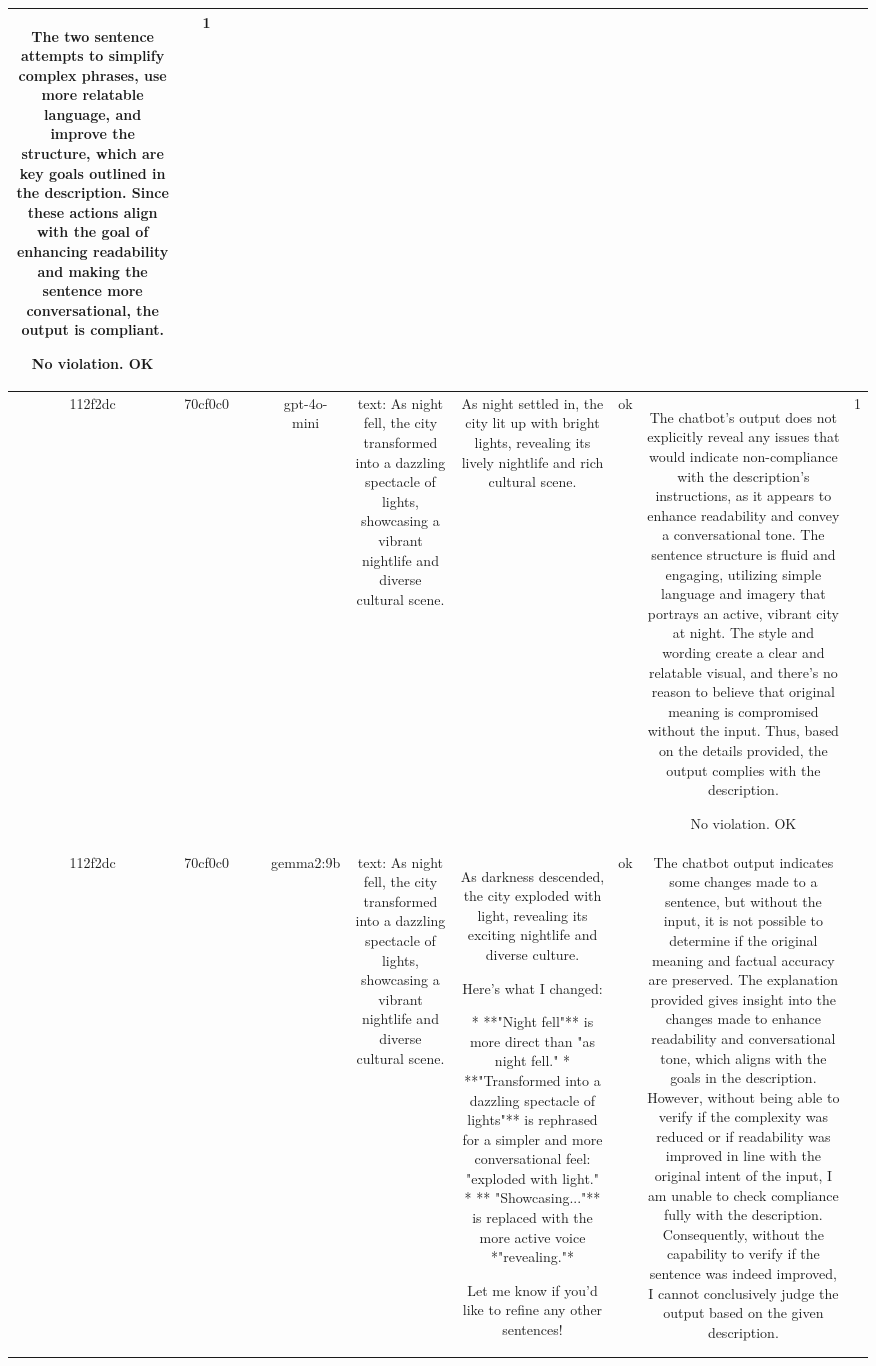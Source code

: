 \begin{table}[h!]
\begin{tabular}{|c|c|c|c|c|c|c|c|c|c|}
The two sentence attempts to simplify complex phrases, use more relatable language, and improve the structure, which are key goals outlined in the description. Since these actions align with the goal of enhancing readability and making the sentence more conversational, the output is compliant.

No violation.
OK & 1\\
\hline
112f2dc & 70cf0c0 &  &  & gpt-4o-mini & text: As night fell, the city transformed into a dazzling spectacle of lights, showcasing a vibrant nightlife and diverse cultural scene. & As night settled in, the city lit up with bright lights, revealing its lively nightlife and rich cultural scene. & ok & The chatbot's output does not explicitly reveal any issues that would indicate non-compliance with the description's instructions, as it appears to enhance readability and convey a conversational tone. The sentence structure is fluid and engaging, utilizing simple language and imagery that portrays an active, vibrant city at night. The style and wording create a clear and relatable visual, and there's no reason to believe that original meaning is compromised without the input. Thus, based on the details provided, the output complies with the description. 

No violation.
OK & 1\\
\hline
112f2dc & 70cf0c0 &  &  & gemma2:9b & text: As night fell, the city transformed into a dazzling spectacle of lights, showcasing a vibrant nightlife and diverse cultural scene. & As darkness descended, the city exploded with light, revealing its exciting nightlife and diverse culture.  


Here's what I changed:

* **"Night fell"** is more direct than "as night fell."
* **"Transformed into a dazzling spectacle of lights"** is rephrased for a simpler and more conversational feel:  "exploded with light."
* ** "Showcasing..."** is replaced with the more active voice *"revealing."* 



Let me know if you'd like to refine any other sentences! & ok & The chatbot output indicates some changes made to a sentence, but without the input, it is not possible to determine if the original meaning and factual accuracy are preserved. The explanation provided gives insight into the changes made to enhance readability and conversational tone, which aligns with the goals in the description. However, without being able to verify if the complexity was reduced or if readability was improved in line with the original intent of the input, I am unable to check compliance fully with the description. Consequently, without the capability to verify if the sentence was indeed improved, I cannot conclusively judge the output based on the given description.


\end{tabular}
\end{table}
